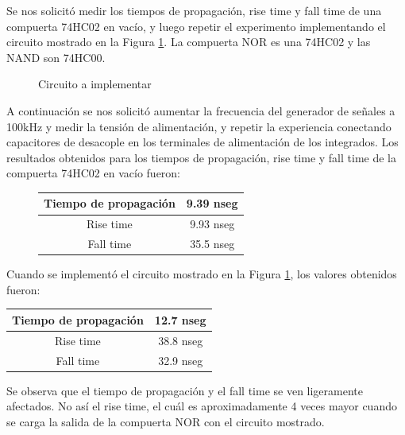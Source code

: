 
Se nos solicitó medir los tiempos de propagación, rise time y fall time de una compuerta 74HC02 en vacío, y luego repetir el experimento implementando el circuito mostrado en la Figura \ref{4_fig3}. La compuerta NOR es una 74HC02 y las NAND son 74HC00.
%

\begin{figure}
\begin{center}
\resizebox{.5\linewidth}{!}{\parbox{\linewidth}{}}
\caption{Circuito a implementar}
\label{4_fig3}
\end{center}
\end{figure}

A continuación se nos solicitó aumentar la frecuencia del generador de señales a 100kHz y medir la tensión de alimentación, y repetir la experiencia conectando capacitores de desacople en los terminales de alimentación de los integrados.
Los resultados obtenidos para los tiempos de propagación, rise time y fall time de la compuerta 74HC02 en vacío fueron:

\begin{figure}[H]
\begin{flushright}
\begin{tabular}{|c|c|}
\hline 
Tiempo de propagación & 9.39 nseg \\ 
\hline 
Rise time & 9.93 nseg \\ 
\hline 
Fall time & 35.5 nseg \\ 
\hline 
\end{tabular}
\end{flushright}
\end{figure}

Cuando se implementó el circuito mostrado en la Figura \ref{4_fig3}, los valores obtenidos fueron:

\begin{center}
\begin{tabular}{|c|c|}
\hline 
Tiempo de propagación & 12.7 nseg \\ 
\hline 
Rise time & 38.8 nseg \\ 
\hline 
Fall time & 32.9 nseg \\ 
\hline 
\end{tabular}
\end{center}

Se observa que el tiempo de propagación y el fall time se ven ligeramente afectados. No así el rise time, el cuál es aproximadamente 4 veces mayor cuando se carga la salida de la compuerta NOR con el circuito mostrado.

